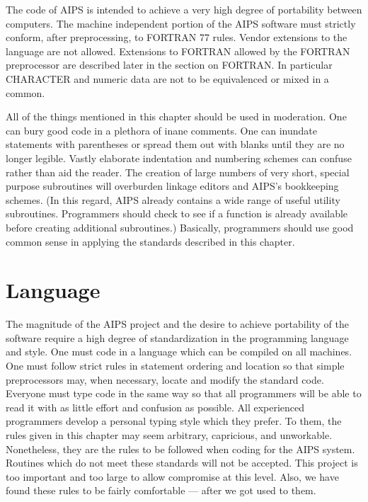 The code of AIPS is intended to achieve a very high degree of
portability between computers.  The machine independent portion of the
AIPS software must strictly conform, after preprocessing, to FORTRAN
77 rules.  Vendor extensions to the language are not allowed.
Extensions to FORTRAN allowed by the FORTRAN preprocessor are
described later in the section on FORTRAN.  In particular CHARACTER
and numeric data are not to be equivalenced or mixed in a common.

All of the things mentioned in this chapter should be used in
moderation.  One can bury good code in a plethora of inane comments.
One can inundate statements with parentheses or spread them out with
blanks until they are no longer legible.  Vastly elaborate indentation
and numbering schemes can confuse rather than aid the reader.  The
creation of large numbers of very short, special purpose subroutines
will overburden linkage editors and AIPS's bookkeeping schemes.  (In
this regard, AIPS already contains a wide range of useful utility
subroutines.  Programmers should check to see if a function is already
available before creating additional subroutines.)  Basically,
programmers should use good common sense in applying the standards
described in this chapter.



\section{Language}
The magnitude of the AIPS project and the desire to achieve
portability of the software require a high degree of standardization
in the programming language and style.  One must code in a language
which can be compiled on all machines.  One must follow strict rules
in statement ordering and location so that simple preprocessors may,
when necessary, locate and modify the standard code.  Everyone must
type code in the same way so that all programmers will be able to read
it with as little effort and confusion as possible.  All experienced
programmers develop a personal typing style which they prefer.  To
them, the rules given in this chapter may seem arbitrary, capricious,
and unworkable.  Nonetheless, they are the rules to be followed when
coding for the AIPS system.  Routines which do not meet these
standards will not be accepted.  This project is too important and too
large to allow compromise at this level.  Also, we have found these
rules to be fairly comfortable --- after we got used to them.


